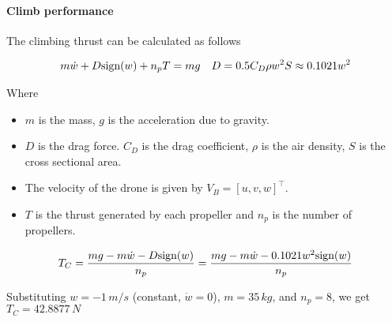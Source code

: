 \paragraph*{Climb performance}

The climbing thrust can be calculated as follows

\begin{align*}
    m \dot{w} + D \textup{sign}(w) + n_p T = mg &&
    D = 0.5 C_D \rho w^2 S \approx 0.1021 w^2
\end{align*}

Where

\begin{itemize}
    \item $m$ is the mass, $g$ is the acceleration due to gravity.
    \item $D$ is the drag force. $C_D$ is the drag coefficient, $\rho$ is the air density, $S$ is the cross sectional area.
    \item The velocity of the drone is given by $V_B = [u, v, w]^\top$.
    \item $T$ is the thrust generated by each propeller and $n_p$ is the number of propellers.
\end{itemize}

\begin{equation}
    T_C = \frac{mg - m\dot{w} - D\textup{sign}(w)}{n_p} = \frac{mg - m\dot{w} - 0.1021 w^2 \textup{sign}(w)}{n_p}
\end{equation}

Substituting $w=-1\,m/s$ (constant, $\dot{w} = 0$), $m=35\,kg$, and $n_p=8$, we get $T_C = 42.8877\,N$
